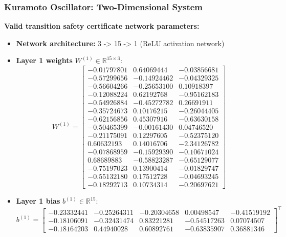 \subsubsection{Kuramoto Oscillator: Two-Dimensional System}
\label{app:ko2d_neural}
\textbf{Valid transition safety certificate network parameters:}
\begin{itemize}
    \item \textbf{Network architecture:} 3 -> 15 -> 1 (ReLU activation network)
    \item \textbf{Layer 1 weights} $W^{(1)} \in \mathbb{R}^{15 \times 3}$:
    {\footnotesize
    \[
    W^{(1)} = \begin{bmatrix}
    -0.01797801 &  0.64069444 & -0.03856681 \\
    -0.57299656 & -0.14924462 & -0.04329325 \\
    -0.56604266 & -0.25653100 &  0.10918397 \\
    -0.12088224 &  0.62192768 & -0.95162183 \\
    -0.54926884 & -0.45272782 &  0.26691911 \\
    -0.35724673 &  0.10176215 & -0.26044405 \\
    -0.62156856 &  0.45307916 & -0.63630158 \\
    -0.50465399 & -0.00161430 &  0.04746520 \\
    -0.21175091 &  0.12297605 & -0.52375120 \\
     0.60632193 &  0.14016706 & -2.34126782 \\
    -0.07868959 & -0.15929390 & -0.10671024 \\
     0.68689883 & -0.58823287 & -0.65129077 \\
    -0.75197023 &  0.13900414 & -0.01829747 \\
    -0.55132180 &  0.17512728 & -0.04693245 \\
    -0.18292713 &  0.10734314 & -0.20697621
    \end{bmatrix}
    \]}
    
    \item \textbf{Layer 1 bias} $b^{(1)} \in \mathbb{R}^{15}$:
    {\scriptsize
    \[
    b^{(1)} = \begin{bmatrix}
    -0.23332441 & -0.25264311 & -0.20304658 &  0.00498547 & -0.41519192 \\
    -0.18106091 & -0.32431474 &  0.83221281 & -0.54517263 &  0.07074507 \\
    -0.18164203 &  0.44940028 &  0.60892761 & -0.63835907 &  0.36881346
    \end{bmatrix}^\top
    \]}
    

\end{itemize}
